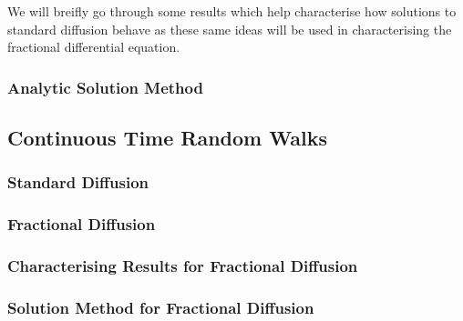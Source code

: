 We will breifly go through some results which help characterise how solutions to standard diffusion behave as these same ideas will be used in characterising the fractional differential equation.

\subsubsection{Analytic Solution Method}



\subsection{Continuous Time Random Walks}

\subsubsection{Standard Diffusion}
\subsubsection{Fractional Diffusion}
\subsubsection{Characterising Results for Fractional Diffusion}
\subsubsection{Solution Method for Fractional Diffusion}

\clearpage 
